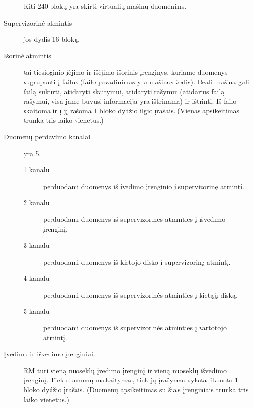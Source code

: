 \begin{description}
    Kiti 240 blokų yra skirti virtualių mašinų duomenims.
  \item[Supervizorinė atmintis] jos dydis 16 blokų.
  \item[Išorinė atmintis] tai tiesioginio įėjimo ir išėjimo išorinis
    įrenginys, kuriame duomenys sugrupuoti į failus (failo pavadinimas
    yra mašinos žodis). Reali mašina gali failą sukurti, atidaryti
    skaitymui, atidaryti rašymui (atidarius failą rašymui, visa 
    jame buvusi informacija yra ištrinama) ir ištrinti. Iš failo skaitoma
    ir į jį rašoma 1 bloko dydžio ilgio įrašais. (Vienas apsikeitimas 
    trunka tris laiko vienetus.)
  \item[Duomenų perdavimo kanalai] yra 5. 
    \begin{description}
      \item[1 kanalu] perduodami duomenys iš įvedimo įrenginio į 
        supervizorinę atmintį.
      \item[2 kanalu] perduodami duomenys iš supervizorinės atminties
        į išvedimo įrenginį.
      \item[3 kanalu] perduodami duomenys iš kietojo disko į supervizorinę
        atmintį.
      \item[4 kanalu] perduodami duomenys iš supervizorinės atminties į 
        kietąjį diską.
      \item[5 kanalu] perduodami duomenys iš supervizorinės atminties į 
        vartotojo atmintį.
    \end{description}
  \item[Įvedimo ir išvedimo įrenginiai.] RM turi vieną nuoseklų įvedimo
    įrenginį ir vieną nuoseklų išvedimo įrenginį. Tiek duomenų nuskaitymas,
    tiek jų įrašymas vyksta fiksuoto 1 bloko dydžio įrašais. (Duomenų
    apsikeitimas su šiais įrenginiais trunka tris laiko vienetus.)
\end{description}
